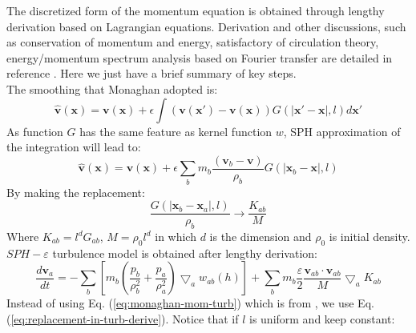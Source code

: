 \documentclass[journal abbreviation, manuscript]{copernicus}
\begin{document}
The discretized form of the momentum equation is obtained through lengthy derivation based on Lagrangian equations. Derivation and other discussions, such as conservation of momentum and energy, satisfactory of circulation theory, energy/momentum spectrum analysis based on Fourier transfer are detailed in reference \citep{monaghan2011turbulence}. Here we just have a brief summary of key steps.\\
The smoothing that Monaghan adopted is:
\begin{equation}
\widehat{\textbf{v}}(\textbf{x})=\textbf{v}(\textbf{x})+ \epsilon \int (\textbf{v}(\textbf{x} \prime)-\textbf{v}(\textbf{x}))G(\vert \textbf{x} \prime - \textbf{x} \vert, l) d\textbf{x} \prime
\end{equation}
As function $G$ has the same feature as kernel function $w$, SPH approximation of the integration will lead to:
\begin{equation} \label{eq:SPH-epsilon-filtering}
\widehat{\textbf{v}}(\textbf{x})=\textbf{v}(\textbf{x})+\epsilon \sum_b m_b \dfrac{(\textbf{v}_b -\textbf{v})}{\rho _b} G(\vert \textbf{x} _b - \textbf{x} \vert, l)
\end{equation}
By making the replacement:
\begin{equation}
\label{eq:replacement-in-turb-derive}
\dfrac{G(\vert \textbf{x} _b - \textbf{x} _a \vert, l)}{\rho _b} \rightarrow \dfrac{K_{ab}}{M}
\end{equation}
Where $K_{ab} = l^d G_{ab}$, $M = \rho_0 l^d$ in which $d$ is the dimension and $\rho_0$ is initial density. $SPH-\varepsilon$ turbulence model is obtained after lengthy derivation:
\begin{equation}
\label{eq:monaghan-mom-turb}
\dfrac{d \textbf{v}_a}{dt} = -\sum_b [m_b (\dfrac{p_b}{\rho_b^2} + \dfrac{p_a}{\rho_a^2}) \bigtriangledown_aw_{a b}(h)] + \sum_b m_b \dfrac{\varepsilon}{2} \dfrac{\textbf{v}_{ab} \cdot \textbf{v}_{ab}}{M} \bigtriangledown_a K_{ab}
\end{equation}
Instead of using Eq. (\ref{eq:monaghan-mom-turb}) which is from \citet{monaghan2011turbulence}, we use Eq. (\ref{eq:replacement-in-turb-derive}). Notice that if $l$ is uniform and keep constant: 
\end{document}

